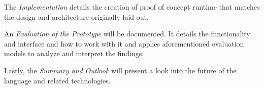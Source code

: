 \documentclass[oneside,11pt,xetex]{scrbook}
\begin{document}
The \emph{Implementation} details the creation of proof of concept runtime that matches the design and architecture originally laid out.

An \emph{Evaluation of the Prototype} will be documented. It details the functionality and interface and how to work with it and applies aforementioned evaluation models to analyze and interpret the findings.

Lastly, the \emph{Summary and Outlook} will present a look into the future of the language and related technologies.




\end{document}
